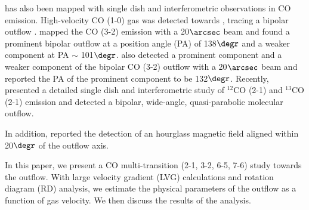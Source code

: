  has also been mapped with single dish and interferometric observations in CO emission. High-velocity CO (1-0) gas was detected towards  \citep{1991AJ....101.1435M,1996ApJ...457..267S}, tracing a bipolar outflow \citep{1996ApJ...457..267S}. \citet{1997PhDT........21H} mapped the CO (3-2) emission with a 20${\arcsec}$ beam and found a prominent bipolar outflow at a position angle (PA) of 138${\degr}$ and a weaker component at PA $\sim$ 101${\degr}$. \citet{2003A&A...412..175K} also detected a prominent component and a weaker component of the bipolar CO (3-2) outflow with a 20${\arcsec}$ beam and reported the PA of the prominent component to be 132${\degr}$. Recently, \citet{2009ApJ...696...66Q} presented a detailed single dish and interferometric study of $^{12}$CO (2-1) and $^{13}$CO (2-1) emission and detected a bipolar, wide-angle, quasi-parabolic molecular outflow. 

In addition, \citet{2014ApJ...794L..18Q} reported the detection of an hourglass magnetic field aligned within 20${\degr}$ of the outflow axis.

In this paper, we present a CO multi-transition (2-1, 3-2, 6-5, 7-6) study towards the  outflow. With large velocity gradient (LVG) calculations and rotation diagram (RD) analysis, we estimate the physical parameters of the outflow as a function of gas velocity. We then discuss the results of the analysis.


